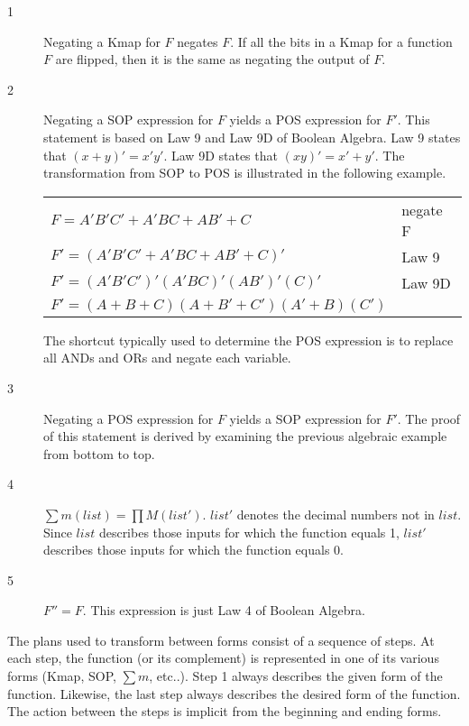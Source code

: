 \begin{description}
\item [1]
Negating a Kmap for $F$ negates $F$.  If all the 
bits in a Kmap for a function $F$ are flipped, then it is
the same as negating the output of $F$.

\item [2] 
Negating a SOP expression for $F$ yields a POS 
\label{page:second} expression for $F'$.  This statement is 
based on Law 9 and Law 9D of Boolean Algebra.  Law 9 states that 
$(x+y)' = x'y'$.  Law 9D states that $(xy)' = x'+y'$.
The transformation from SOP to POS is illustrated
in the following example.

\begin{tabular}[ht]{ll}
$F  = A'B'C' + A'BC + AB' + C$      & negate F \\
$F' = (A'B'C' + A'BC + AB' + C)'$   & Law 9 \\
$F' = (A'B'C')'(A'BC)'(AB')'(C)'$   & Law 9D \\
$F' = (A+B+C)(A+B'+C')(A'+B)(C')$  \\
\end{tabular}

The shortcut typically used to determine the POS expression
is to replace all ANDs and ORs and negate each variable. 

\item [3] 
Negating a POS expression for $F$ yields a SOP 
expression for $F'$.  The proof of this statement is
derived by examining the previous algebraic example from
bottom to top.

\item [4] 
$\sum m(list) = \prod M(list')$.  $list'$ 
denotes the decimal numbers not in $list$.  Since $list$ 
describes those inputs for which the function equals 1, 
$list'$ describes those inputs for which the function 
equals 0. 

\item [5] $F'' = F$.  
This expression is just Law 4 of Boolean Algebra.
\end{description}

The plans used to transform between forms consist 
of a sequence of steps.  At each step, the function 
(or its complement) is represented in one
of its various forms (Kmap, SOP, $\sum m$, etc..). 
Step 1 always describes the given form of the function.  
Likewise, the last step always describes the desired form
of the function.  The action between the steps is implicit
from the beginning and ending forms.  

